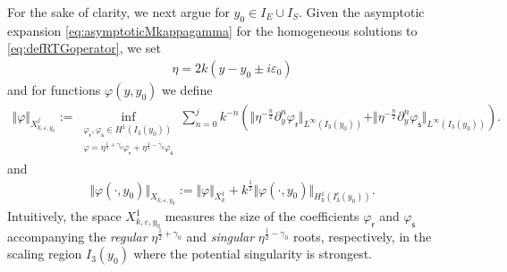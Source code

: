 \documentclass[11pt,reqno]{amsproc}
\theoremstyle{definition}
\numberwithin{equation}{section}
\newcommand{\sr}{{\mathsf{r}}}
\newcommand{\s}{{\mathsf{s}}}
\newcommand{\ep}{\varepsilon}
\begin{document}
For the sake of clarity, we next argue for $y_0\in I_E\cup I_S$.  Given the asymptotic expansion \eqref{eq:asymptoticMkappagamma} for the homogeneous solutions to \eqref{eq:defRTGoperator}, we set 
\begin{align*}
\eta = 2k(y-y_0\pm i\ep_0)
\end{align*}
and for functions $\varphi(y,y_0)$ we define
\begin{align*}
\Vert \varphi \Vert_{X_{k,\ep,y_0}^j}:=\inf_{\substack{\varphi_\sr, \varphi_\s \in H^1(I_3(y_0)) \\  \varphi = \eta^{\frac12+\gamma_0}\varphi_\sr + \eta^{\frac12-\gamma_0}\varphi_\s }} \sum_{n=0}^j k^{-n}\left( \Vert \eta^{-\frac{n}{2}}\partial_y^n\varphi_\sr\Vert_{L^{\infty}(I_3(y_0))} + \Vert \eta^{-\frac{n}{2}} \partial_y^n\varphi_\s\Vert_{L^{\infty}(I_3(y_0))} \right).
\end{align*}
and
\begin{align*}
\Vert \varphi(\cdot, y_0) \Vert_{X_{k,\ep,y_0}} := \Vert \varphi \Vert_{X_k^1}  + k^\frac12\Vert \varphi(\cdot, y_0) \Vert_{H^1_k(I_3^c(y_0))}. 
\end{align*}
Intuitively, the space $X_{k,\ep,y_0}^1$ measures the size of the coefficients $\varphi_\sr$ and $\varphi_\s$ accompanying the \textit{regular} $\eta^{\frac12+\gamma_0}$ and \textit{singular} $\eta^{\frac12-\gamma_0}$ roots, respectively, in the scaling region $I_3(y_0)$ where the potential singularity is strongest. 
\end{document}
